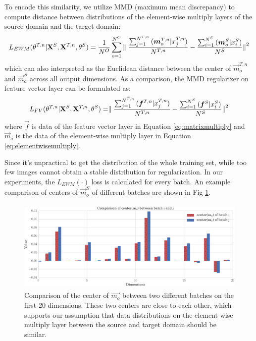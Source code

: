 \documentclass[runningheads]{llncs}
\begin{document}
To encode this similarity, we utilize MMD (maximum mean discrepancy)\cite{gretton2006kernel} to compute distance between distributions of the element-wise multiply layers of the source domain and the target domain:
\begin{equation}\label{equation:LMMD}
  L_{EWM}(\theta^{T,n}|{\bf X}^{S},{\bf X}^{T,n},\theta^{S}) = \frac{1}{N^{O}} \sum^{N^{O}}_{o=1}{ \parallel \frac{\sum^{N^{T,n}}_{j=1}{(\vec{m}^{T,n}_{o}|x^{T,n}_{j})}}{N^{T,n}} - \frac{\sum^{N^{S}}_{i=1}{(\vec{m}^{S}_{o}|x^{S}_{i})}}{N^{S}} {\parallel}^{2}  }
\end{equation}
which can also interpreted as the Euclidean distance between the center of $\vec{m}^{T,n}_{o}$ and $\vec{m}^{S}_{o}$ across all output dimensions. As a comparison, the MMD regularizer on feature vector layer can be formulated as:
\begin{equation}\label{equation:LMMD}
  L_{FV}(\theta^{T,n}|{\bf X}^{S},{\bf X}^{T,n},\theta^{S}) = \parallel \frac{\sum^{N^{T,n}}_{j=1}{(\vec{f}^{T,n}|x^{T,n}_{j})}}{N^{T,n}} - \frac{\sum^{N^{S}}_{i=1}{(\vec{f}^{S}|x^{S}_{i})}}{N^{S}} {\parallel}^{2}
\end{equation}
where $\vec{f}$ is data of the feature vector layer in Equation \ref{eq:matrixmultiply} and $\vec{m}_{o}$ is the data of the element-wise multiply layer in Equation \ref{eq:elementwisemultiply}.

Since it's unpractical to get the distribution of the whole training set, while too few images cannot obtain a stable distribution for regularization. In our experiments, the $L_{EWM}(\cdot)$ loss is calculated for every batch. An example comparison of centers of $\vec{m}^{S}_{o}$ of different batches are shown in Fig \ref{fig:mmd2}.

\begin{figure}
\centering
\includegraphics[height=4.5cm]{images/mmd2.pdf}
\caption{Comparison of the center of $\vec{m_{o}}$ between two different batches on the first 20 dimensions. These two centers are close to each other, which supports our assumption that data distributions on the element-wise multiply layer between the source and target domain should be similar.  }
\label{fig:mmd2}
\end{figure}
\end{document}
